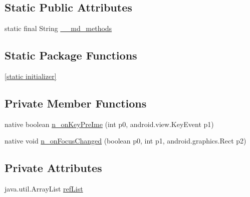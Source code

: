 \subsection*{Static Public Attributes}
\begin{CompactItemize}
\item 
static final String \hyperlink{classmd5b60ffeb829f638581ab2bb9b1a7f4f3f_1_1_entry_cell_edit_text_12054a03c17af4ab15a7d12108ce682a}{\_\-\_\-md\_\-methods}
\end{CompactItemize}
\subsection*{Static Package Functions}
\begin{CompactItemize}
\item 
\hyperlink{classmd5b60ffeb829f638581ab2bb9b1a7f4f3f_1_1_entry_cell_edit_text_31875e94294c3cd7f286afc776f43bc7}{\mbox{[}static initializer\mbox{]}}
\end{CompactItemize}
\subsection*{Private Member Functions}
\begin{CompactItemize}
\item 
native boolean \hyperlink{classmd5b60ffeb829f638581ab2bb9b1a7f4f3f_1_1_entry_cell_edit_text_bbfea7c47615a8f58683006cb0629287}{n\_\-onKeyPreIme} (int p0, android.view.KeyEvent p1)
\item 
native void \hyperlink{classmd5b60ffeb829f638581ab2bb9b1a7f4f3f_1_1_entry_cell_edit_text_448e938035b755ec2d8f82eecf7787e5}{n\_\-onFocusChanged} (boolean p0, int p1, android.graphics.Rect p2)
\end{CompactItemize}
\subsection*{Private Attributes}
\begin{CompactItemize}
\item 
java.util.ArrayList \hyperlink{classmd5b60ffeb829f638581ab2bb9b1a7f4f3f_1_1_entry_cell_edit_text_2f5977b580ca5011d855f06a7ba1101b}{refList}
\end{CompactItemize}


